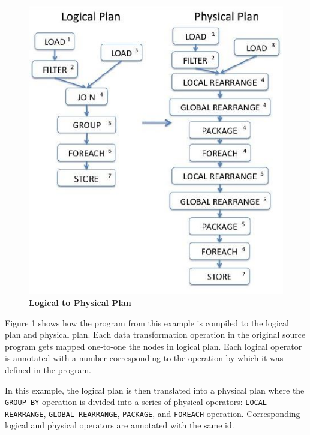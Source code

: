 \begin{figure}
\begin{center}
\includegraphics[scale=0.5]{Images/LogicalPhysicalPlan.JPG}
\end{center}
\caption{\textbf{Logical to Physical Plan} \cite{gates2009building}}
\end{figure}

Figure 1 shows how the program from this example is compiled to the logical plan and physical plan. Each data transformation operation in the original source program gets mapped one-to-one the nodes in logical plan. Each logical operator is annotated with a number corresponding to the operation by which it was defined in the program.

In this example, the logical plan is then translated into a physical plan where the \texttt{GROUP BY} operation is divided into a series of physical operators: \texttt{LOCAL REARRANGE}, \texttt{GLOBAL REARRANGE}, \texttt{PACKAGE}, and \texttt{FOREACH} operation. Corresponding logical and physical operators are annotated with the same id.
